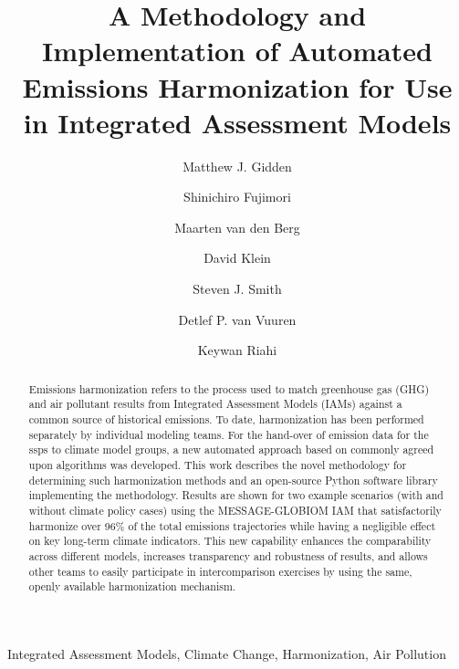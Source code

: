 \documentclass[review]{elsarticle}
\begin{document}
\begin{frontmatter}

\title{A Methodology and Implementation of Automated Emissions Harmonization for Use in Integrated Assessment Models}

\author[iiasa]{Matthew J. Gidden}

\author[nies]{Shinichiro Fujimori}
\author[pbl]{Maarten van den Berg}
\author[pik]{David Klein}
\author[pnnl]{Steven J. Smith}
\author[pbl]{Detlef P. van Vuuren}
\author[iiasa]{Keywan Riahi}

\address[iiasa]{International Institute for Applied Systems Analysis,
  Schlossplatz 1, A-2361 Laxenburg, Austria}
\address[nies]{Center for Social and Environmental Systems Research, National Institute for Environmental Studies, 16-2 Onogawa, Tsukuba, Ibaraki 305-8506, Japan}
\address[pbl]{PBL Netherlands Environmental Assessment Agency, Postbus 30314, 2500 GH The Hague, Netherlands}
\address[pik]{Potsdam Institute for Climate Impact Research (PIK), Member of the Leibniz Association, P.O. Box 60 12 03, D-14412 Potsdam, Germany}
\address[pnnl]{Joint Global Change Research Institute, 5825 University Research Court, Suite 3500, College Park, MD 20740}

\begin{abstract}
Emissions harmonization refers to the process used to match greenhouse gas (GHG)
and air pollutant results from Integrated Assessment Models (IAMs) against a
common source of historical emissions. To date, harmonization has been performed
separately by individual modeling teams. For the hand-over of emission data for
the \gls{ssps} to climate model groups, a new automated approach based on
commonly agreed upon algorithms was developed. This work describes the novel
methodology for determining such harmonization methods and an open-source Python
software library implementing the methodology. Results are shown for two example
scenarios (with and without climate policy cases) using the MESSAGE-GLOBIOM IAM
that satisfactorily harmonize over 96\% of the total emissions trajectories
while having a negligible effect on key long-term climate indicators. This new
capability enhances the comparability across different models, increases
transparency and robustness of results, and allows other teams to easily
participate in intercomparison exercises by using the same, openly available
harmonization mechanism.
\end{abstract}

\begin{keyword}
Integrated Assessment Models, Climate Change, Harmonization, Air Pollution 
\end{keyword}

\end{frontmatter}
\end{document}
